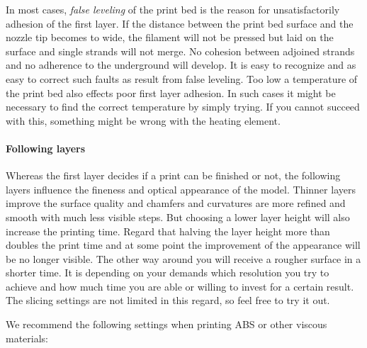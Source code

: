 In most cases, \emph{false leveling} of the print bed is the reason for unsatisfactorily adhesion of the first layer. If the distance between the print bed surface and the nozzle tip becomes to wide, the filament will not be pressed but laid on the surface and single strands will not merge. No cohesion between adjoined strands and no adherence to the underground will develop. It is easy to recognize and as easy to correct such faults as result from false leveling.
Too low a temperature of the print bed also effects poor first layer adhesion. In such cases it might be necessary to find the correct temperature by simply trying. If you cannot succeed with this, something might be wrong with the heating element. 


\paragraph{Following layers}

Whereas the first layer decides if a print can be finished or not, the following layers influence the fineness and optical appearance of the model. Thinner layers improve the surface quality and chamfers and curvatures are more refined and smooth with much less visible steps. But choosing a lower layer height will also increase the printing time. Regard that halving the layer height more than doubles the print time and at some point the improvement of the appearance will be no longer visible. The other way around you will receive a rougher surface in a shorter time. It is depending on your demands which resolution you try to achieve and how much time you are able or willing to invest for a certain result. The slicing settings are not limited in this regard, so feel free to try it out.

We recommend the following settings when printing ABS or other viscous materials: 

